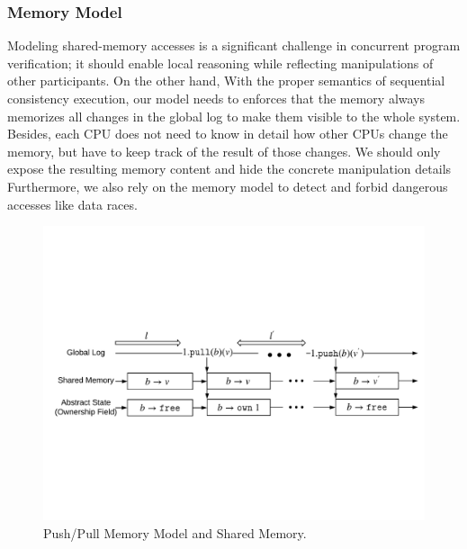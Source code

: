 \subsubsection{Memory Model}

Modeling shared-memory accesses is 
a significant challenge in concurrent program verification;
it should enable local reasoning while reflecting manipulations of other participants.
On the other hand, 
With the proper semantics of sequential consistency execution,
our model needs to enforces that the memory always memorizes all changes in the global log to make them visible to the whole system.
Besides,   
each CPU does not need to know in detail how other CPUs 
change the memory, but have to keep track of the result of those changes.
We should  only expose the resulting memory 
content and hide the concrete manipulation details
Furthermore, we also rely on the memory model
to detect and forbid dangerous accesses like data races.


\begin{figure}
\includegraphics[width=\textwidth]{figs/ccal/pushpullsharedmemory}
\caption{Push/Pull Memory Model and Shared Memory.}
\label{fig:chapter:ccal:push-pull-memory-model-and-shared-memory}
\end{figure}

